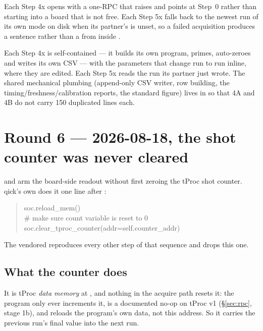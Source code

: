 Each Step 4x opens with a one-RPC  that raises and points at
Step~0 rather than starting into a board that is not free. Each Step 5x falls back
to the newest run of its own mode on disk when its partner's  is
unset, so a failed acquisition produces a sentence rather than a 
from inside .

Each Step 4x is self-contained --- it builds its own program, primes, auto-zeroes and
writes its own CSV --- with the parameters that change run to run inline, where they
are edited. Each Step 5x reads the run its partner just wrote. The shared mechanical
plumbing (append-only CSV writer, row building, the timing/freshness/calibration
reports, the standard figure) lives in  so
that 4A and 4B do not carry 150 duplicated lines each.

\section{Round 6 --- 2026-08-18, the shot counter was never cleared}
\label{sec:counter}

\begin{keybox}
 and  arm the board-side readout without first zeroing
the tProc shot counter. qick's own  does it one
line after :
\begin{quote}\small\ttfamily
soc.reload\_mem()\\
\# make sure count variable is reset to 0\\
soc.clear\_tproc\_counter(addr=self.counter\_addr)
\end{quote}
The vendored  reproduces every other
step of that sequence and drops this one.
\end{keybox}

\subsection{What the counter does}

It is tProc \emph{data memory} at , and nothing in the acquire
path resets it: the program only ever increments it, 
is a documented no-op on tProc v1 (\S\ref{sec:rpc}, stage 1b), and
 reloads the program's own data, not this address. So it carries
the previous run's final value into the next run.

